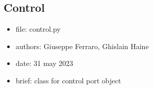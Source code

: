 \documentclass[letterpaper,10pt,english]{sphinxmanual}
\begin{document}
\subsection{Control}
\label{\detokenize{scrimp:module-scrimp.control}}\label{\detokenize{scrimp:control}}\begin{itemize}
\item {} 
\sphinxAtStartPar
file:             control.py

\item {} 
\sphinxAtStartPar
authors:          Giuseppe Ferraro, Ghislain Haine

\item {} 
\sphinxAtStartPar
date:             31 may 2023

\item {} 
\sphinxAtStartPar
brief:            class for control port object

\end{itemize}
\end{document}
